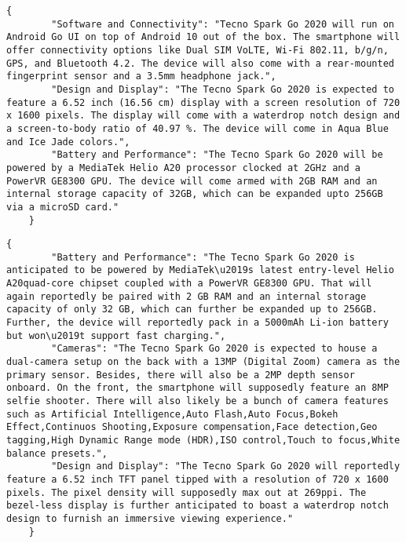     \begin{figure*}[ht]
    \begin{lstlisting}[style=reviews, frame = single, caption=Output generated with StructLM trained with eC-Tab2Text., label=code:JSON-StructLM]
    {
        "Software and Connectivity": "Tecno Spark Go 2020 will run on Android Go UI on top of Android 10 out of the box. The smartphone will offer connectivity options like Dual SIM VoLTE, Wi-Fi 802.11, b/g/n, GPS, and Bluetooth 4.2. The device will also come with a rear-mounted fingerprint sensor and a 3.5mm headphone jack.",
        "Design and Display": "The Tecno Spark Go 2020 is expected to feature a 6.52 inch (16.56 cm) display with a screen resolution of 720 x 1600 pixels. The display will come with a waterdrop notch design and a screen-to-body ratio of 40.97 %. The device will come in Aqua Blue and Ice Jade colors.",
        "Battery and Performance": "The Tecno Spark Go 2020 will be powered by a MediaTek Helio A20 processor clocked at 2GHz and a PowerVR GE8300 GPU. The device will come armed with 2GB RAM and an internal storage capacity of 32GB, which can be expanded upto 256GB via a microSD card."
    }
    \end{lstlisting}
    \end{figure*}
    
    
    \begin{figure*}[ht]
    \begin{lstlisting}[style=reviews, frame = single, caption=Output generated with Llama2 trained with eC-Tab2Text., label=code:JSON-Llama2]
    {
        "Battery and Performance": "The Tecno Spark Go 2020 is anticipated to be powered by MediaTek\u2019s latest entry-level Helio A20quad-core chipset coupled with a PowerVR GE8300 GPU. That will again reportedly be paired with 2 GB RAM and an internal storage capacity of only 32 GB, which can further be expanded up to 256GB. Further, the device will reportedly pack in a 5000mAh Li-ion battery but won\u2019t support fast charging.",
        "Cameras": "The Tecno Spark Go 2020 is expected to house a dual-camera setup on the back with a 13MP (Digital Zoom) camera as the primary sensor. Besides, there will also be a 2MP depth sensor onboard. On the front, the smartphone will supposedly feature an 8MP selfie shooter. There will also likely be a bunch of camera features such as Artificial Intelligence,Auto Flash,Auto Focus,Bokeh Effect,Continuos Shooting,Exposure compensation,Face detection,Geo tagging,High Dynamic Range mode (HDR),ISO control,Touch to focus,White balance presets.",
        "Design and Display": "The Tecno Spark Go 2020 will reportedly feature a 6.52 inch TFT panel tipped with a resolution of 720 x 1600 pixels. The pixel density will supposedly max out at 269ppi. The bezel-less display is further anticipated to boast a waterdrop notch design to furnish an immersive viewing experience."
    }
    \end{lstlisting}
    \end{figure*}
    